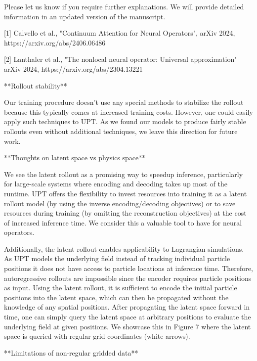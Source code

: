 Please let us know if you require further explanations. We will provide detailed information in an updated version of the manuscript.



[1] Calvello et al., "Continuum Attention for Neural Operators", arXiv 2024, https://arxiv.org/abs/2406.06486

[2] Lanthaler et al., "The nonlocal neural operator: Universal approximation" arXiv 2024, https://arxiv.org/abs/2304.13221


**Rollout stability**

Our training procedure doesn't use any special methods to stabilize the rollout because this typically comes at increased training costs. However, one could easily apply such techniques to UPT.
As we found our models to produce fairly stable rollouts even without additional techniques, we leave this direction for future work.





**Thoughts on latent space vs physics space**

We see the latent rollout as a promising way to speedup inference, particularly for large-scale systems where encoding and decoding takes up most of the runtime.
UPT offers the flexibility to invest resources into training it as a latent rollout model (by using the inverse encoding/decoding objectives) or to save resources during training (by omitting the reconstruction objectives) at the cost of increased inference time. We consider this a valuable tool to have for neural operators.

Additionally, the latent rollout enables applicability to Lagrangian simulations. As UPT models the underlying field instead of tracking individual particle positions it does not have access to particle locations at inference time. Therefore, autoregressive rollouts are impossible since the encoder requires particle positions as input. Using the latent rollout, it is sufficient to encode the initial particle positions into the latent space, which can then be propagated without the knowledge of any spatial positions. After propagating the latent space forward in time, one can simply query the latent space at arbitrary positions to evaluate the underlying field at given positions. We showcase this in Figure 7 where the latent space is queried with regular grid coordinates (white arrows).



**Limitations of non-regular gridded data**


